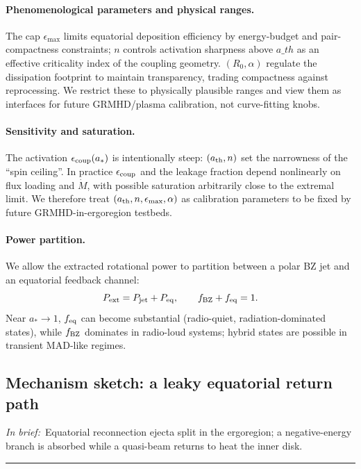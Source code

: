 \documentclass[twocolumn]{aastex701}
\newcommand{\ath}{a_{\rm th}}
\newcommand{\rg}{r_g}
\newcommand{\LEdd}{L_{\rm Edd}}
\newcommand{\Ltot}{L_{\rm tot}}
\newcommand{\FeKa}{\mathrm{Fe\,K}\alpha}
\DeclareRobustCommand{\tldr}[1]{%
  \noindent\textit{In brief:}~#1%
  \par\smallskip
  \noindent\rule{\columnwidth}{0.2pt}\par\medskip
}
\def\ath{a\_th}\def\rg{r\_g}\def\LEdd{L\_Edd}\def\Ltot{L\_tot}\def\FeKa{Fe K\string\alpha}%
\begin{document}
\paragraph{Phenomenological parameters and physical ranges.}
The cap $\epsilon_{\max}$ limits equatorial deposition efficiency by energy-budget and pair-compactness constraints; $n$ controls activation sharpness above $\ath$ as an effective criticality index of the coupling geometry. $(R_0,\alpha)$ regulate the dissipation footprint to maintain transparency, trading compactness against reprocessing. We restrict these to physically plausible ranges and view them as interfaces for future GRMHD/plasma calibration, not curve-fitting knobs.
\paragraph{Sensitivity and saturation.}
The activation $\epsilon_{\rm coup}(a_*)$ is intentionally steep: $(a_{\rm th},n)$ set the narrowness of the “spin ceiling”. In practice $\epsilon_{\rm coup}$ and the leakage fraction depend nonlinearly on flux loading and $\dot M$, with possible saturation arbitrarily close to the extremal limit. We therefore treat $(a_{\rm th},n,\epsilon_{\max},\alpha)$ as calibration parameters to be fixed by future GRMHD-in-ergoregion testbeds.


\paragraph{Power partition.}
We allow the extracted rotational power to partition between a polar BZ jet and an equatorial feedback channel:
\[
P_{\rm ext}=P_{\rm jet}+P_{\rm eq},\qquad f_{\rm BZ}+f_{\rm eq}=1.
\]
Near $a_*\!\to\!1$, $f_{\rm eq}$ can become substantial (radio-quiet, radiation-dominated states), while $f_{\rm BZ}$ dominates in radio-loud systems; hybrid states are possible in transient MAD-like regimes.
\subsection{Mechanism sketch: a leaky equatorial return path}\label{sec:mech-sketch}
\tldr{Equatorial reconnection ejecta split in the ergoregion; a negative-energy branch is absorbed while a quasi-beam returns to heat the inner disk.}
\end{document}
